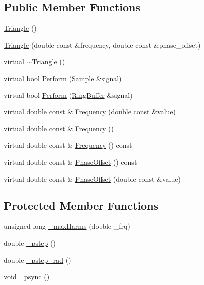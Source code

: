 \subsection*{Public Member Functions}
\begin{DoxyCompactItemize}
\item 
\hyperlink{classSignal_1_1Fourier_1_1Triangle_a7f80eb4d88b6797c4f33bcf0e23bf91d}{Triangle} ()
\item 
\hyperlink{classSignal_1_1Fourier_1_1Triangle_aa7dcd9517c0ed98c77ab96131cc4be73}{Triangle} (double const \&frequency, double const \&phase\+\_\+offset)
\item 
virtual \hyperlink{classSignal_1_1Fourier_1_1Triangle_a8cefa3e6bef6f8bd63a9f78d838b137c}{$\sim$\+Triangle} ()
\item 
virtual bool \hyperlink{classSignal_1_1Fourier_1_1Triangle_ac109464ba9c757e754874e76a2a815cb}{Perform} (\hyperlink{classSignal_1_1Sample}{Sample} \&signal)
\item 
virtual bool \hyperlink{classSignal_1_1Fourier_1_1Triangle_a0c6ab725c3c74af5f1bfa8387b1bd3d3}{Perform} (\hyperlink{classSignal_1_1RingBuffer}{Ring\+Buffer} \&signal)
\item 
virtual double const \& \hyperlink{classSignal_1_1Fourier_1_1Triangle_abad72b183047cecd48251843fb6da58b}{Frequency} (double const \&value)
\item 
virtual double const \& \hyperlink{classSignal_1_1Fourier_1_1Triangle_aa304b34ad2467ad7cc3941b041c9f701}{Frequency} ()
\item 
virtual double const \& \hyperlink{classSignal_1_1SignalGenerator_a96af42ee68f94e9b04d034fd68b73ecd}{Frequency} () const 
\item 
virtual double const \& \hyperlink{classSignal_1_1SignalGenerator_ac2538ec946f001e394d2416fda698d1c}{Phase\+Offset} () const 
\item 
virtual double const \& \hyperlink{classSignal_1_1SignalGenerator_ac6a103ff72beaa338f6d18c812522d78}{Phase\+Offset} (double const \&value)
\end{DoxyCompactItemize}
\subsection*{Protected Member Functions}
\begin{DoxyCompactItemize}
\item 
unsigned long \hyperlink{classSignal_1_1Fourier_1_1FourierGenerator_a99720416bd9ff96636f4acf956a785d5}{\+\_\+max\+Harms} (double \+\_\+frq)
\item 
double \hyperlink{classSignal_1_1SignalGenerator_a43b0eec84ee7df04c947533c0511c2c0}{\+\_\+pstep} ()
\item 
double \hyperlink{classSignal_1_1SignalGenerator_abf2f4ab977c6e84bf85022eab8135304}{\+\_\+pstep\+\_\+rad} ()
\item 
void \hyperlink{classSignal_1_1SignalGenerator_a563f57d4dfd8728a6a572f15c1e2532b}{\+\_\+psync} ()
\end{DoxyCompactItemize}
